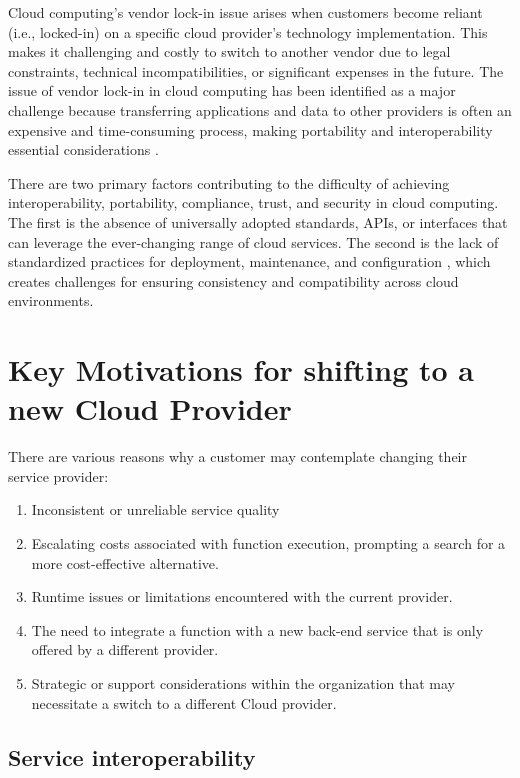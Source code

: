 Cloud computing's vendor lock-in issue arises when customers become reliant (i.e., locked-in) on a specific cloud provider's technology implementation. This makes it challenging and costly to switch to another vendor due to legal constraints, technical incompatibilities, or significant expenses in the future. The issue of vendor lock-in in cloud computing has been identified as a major challenge because transferring applications and data to other providers is often an expensive and time-consuming process, making portability and interoperability essential considerations \cite{guest_2013_oracle}.

There are two primary factors contributing to the difficulty of achieving interoperability, portability, compliance, trust, and security in cloud computing. The first is the absence of universally adopted standards, APIs, or interfaces that can leverage the ever-changing range of cloud services. The second is the lack of standardized practices for deployment, maintenance, and configuration \cite{oparamartins_2014_critical}, which creates challenges for ensuring consistency and compatibility across cloud environments. 

\section{Key Motivations for shifting to a new Cloud Provider}
There are various reasons why a customer may contemplate changing their service provider:

\begin{enumerate}
    \item Inconsistent or unreliable service quality
    \item Escalating costs associated with function execution, prompting a search for a more cost-effective alternative.
    \item Runtime issues or limitations encountered with the current provider.
    \item The need to integrate a function with a new back-end service that is only offered by a different provider.
    \item Strategic or support considerations within the organization that may necessitate a switch to a different Cloud provider.
\end{enumerate}

\subsection{Service interoperability}



